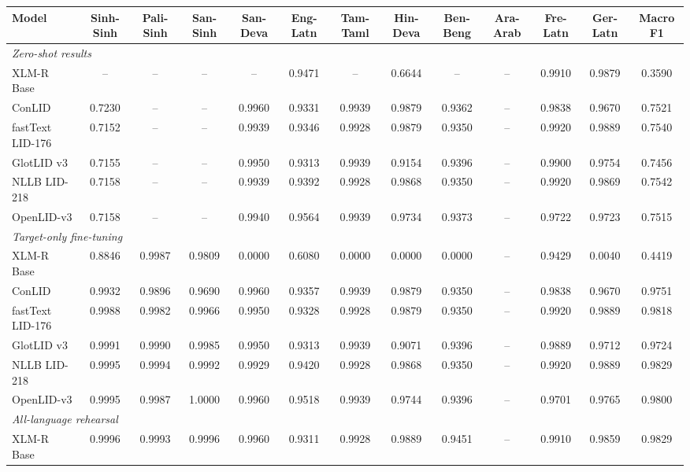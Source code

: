 \begin{table}[p]
\begin{tabular}{l ccc cccccccc c}
\toprule
\textbf{Model} & \textbf{Sinh-Sinh} & \textbf{Pali-Sinh} & \textbf{San-Sinh} & \textbf{San-Deva} & \textbf{Eng-Latn} & \textbf{Tam-Taml} & \textbf{Hin-Deva} & \textbf{Ben-Beng} & \textbf{Ara-Arab} & \textbf{Fre-Latn} & \textbf{Ger-Latn} & \textbf{Macro F1} \\
\midrule
\multicolumn{13}{l}{\textit{Zero-shot results}} \\
XLM-R Base & -- & -- & -- & -- & 0.9471 & -- & 0.6644 & -- & -- & 0.9910 & 0.9879 & 0.3590 \\
ConLID & 0.7230 & -- & -- & 0.9960 & 0.9331 & 0.9939 & 0.9879 & 0.9362 & -- & 0.9838 & 0.9670 & 0.7521 \\
fastText LID-176 & 0.7152 & -- & -- & 0.9939 & 0.9346 & 0.9928 & 0.9879 & 0.9350 & -- & 0.9920 & 0.9889 & 0.7540 \\
GlotLID v3 & 0.7155 & -- & -- & 0.9950 & 0.9313 & 0.9939 & 0.9154 & 0.9396 & -- & 0.9900 & 0.9754 & 0.7456 \\
NLLB LID-218 & 0.7158 & -- & -- & 0.9939 & 0.9392 & 0.9928 & 0.9868 & 0.9350 & -- & 0.9920 & 0.9869 & 0.7542 \\
OpenLID-v3 & 0.7158 & -- & -- & 0.9940 & 0.9564 & 0.9939 & 0.9734 & 0.9373 & -- & 0.9722 & 0.9723 & 0.7515 \\
\midrule
\multicolumn{13}{l}{\textit{Target-only fine-tuning}} \\
XLM-R Base & 0.8846 & 0.9987 & 0.9809 & 0.0000 & 0.6080 & 0.0000 & 0.0000 & 0.0000 & -- & 0.9429 & 0.0040 & 0.4419 \\
ConLID & 0.9932 & 0.9896 & 0.9690 & 0.9960 & 0.9357 & 0.9939 & 0.9879 & 0.9350 & -- & 0.9838 & 0.9670 & 0.9751 \\
fastText LID-176 & 0.9988 & 0.9982 & 0.9966 & 0.9950 & 0.9328 & 0.9928 & 0.9879 & 0.9350 & -- & 0.9920 & 0.9889 & 0.9818 \\
GlotLID v3 & 0.9991 & 0.9990 & 0.9985 & 0.9950 & 0.9313 & 0.9939 & 0.9071 & 0.9396 & -- & 0.9889 & 0.9712 & 0.9724 \\
NLLB LID-218 & 0.9995 & 0.9994 & 0.9992 & 0.9929 & 0.9420 & 0.9928 & 0.9868 & 0.9350 & -- & 0.9920 & 0.9889 & 0.9829 \\
OpenLID-v3 & 0.9995 & 0.9987 & 1.0000 & 0.9960 & 0.9518 & 0.9939 & 0.9744 & 0.9396 & -- & 0.9701 & 0.9765 & 0.9800 \\
\midrule
\multicolumn{13}{l}{\textit{All-language rehearsal}} \\
XLM-R Base & 0.9996 & 0.9993 & 0.9996 & 0.9960 & 0.9311 & 0.9928 & 0.9889 & 0.9451 & -- & 0.9910 & 0.9859 & 0.9829 \\

\end{tabular}
\end{table}
